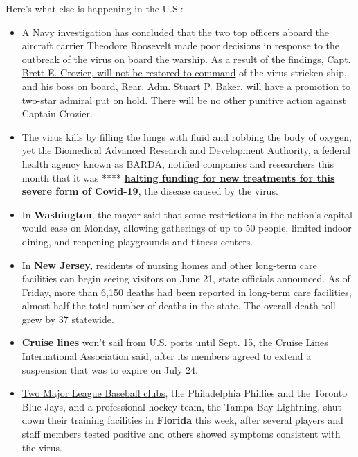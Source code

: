 Here's what else is happening in the U.S.:

\begin{itemize}
\item
  A Navy investigation has concluded that the two top officers aboard
  the aircraft carrier Theodore Roosevelt made poor decisions in
  response to the outbreak of the virus on board the warship. As a
  result of the findings,
  \href{https://www.nytimes.com/2020/06/19/us/politics/carrier-roosevelt-coronavirus-crozier.html}{Capt.
  Brett E. Crozier, will not be restored to command} of the
  virus-stricken ship, and his boss on board, Rear. Adm. Stuart P.
  Baker, will have a promotion to two-star admiral put on hold. There
  will be no other punitive action against Captain Crozier.
\item
  The virus kills by filling the lungs with fluid and robbing the body
  of oxygen, yet the Biomedical Advanced Research and Development
  Authority, a federal health agency known as
  \href{https://medicalcountermeasures.gov/app/barda/coronavirus/COVID19.aspx}{BARDA},
  notified companies and researchers this month that it was ****
  \textbf{\href{https://www.nytimes.com/2020/06/19/health/coronavirus-lung-treatment-funding.html}{halting
  funding for new treatments for this severe form of Covid-19}}, the
  disease caused by the virus.
\end{itemize}

\begin{itemize}
\tightlist
\item
  In \textbf{Washington}, the mayor said that some restrictions in the
  nation's capital would ease on Monday, allowing gatherings of up to 50
  people, limited indoor dining, and reopening playgrounds and fitness
  centers.
\end{itemize}

\begin{itemize}
\item
  In \textbf{New Jersey,} residents of nursing homes and other long-term
  care facilities can begin seeing visitors on June 21, state officials
  announced. As of Friday, more than 6,150 deaths had been reported in
  long-term care facilities, almost half the total number of deaths in
  the state. The overall death toll grew by 37 statewide.
\item
  \textbf{Cruise lines} won't sail from U.S. ports
  \href{https://cruising.org/news-and-research/press-room/2020/june/clia-announces-voluntary-suspension-of-cruise-operations-from-us-ports}{until
  Sept. 15}, the Cruise Lines International Association said, after its
  members agreed to extend a suspension that was to expire on July 24.
\item
  \href{https://www.nytimes.com/2020/06/19/sports/phillies-blue-jays-coronavirus-mlb.html}{Two
  Major League Baseball clubs}, the Philadelphia Phillies and the
  Toronto Blue Jays, and a professional hockey team, the Tampa Bay
  Lightning, shut down their training facilities in \textbf{Florida}
  this week, after several players and staff members tested positive and
  others showed symptoms consistent with the virus.
\end{itemize}


